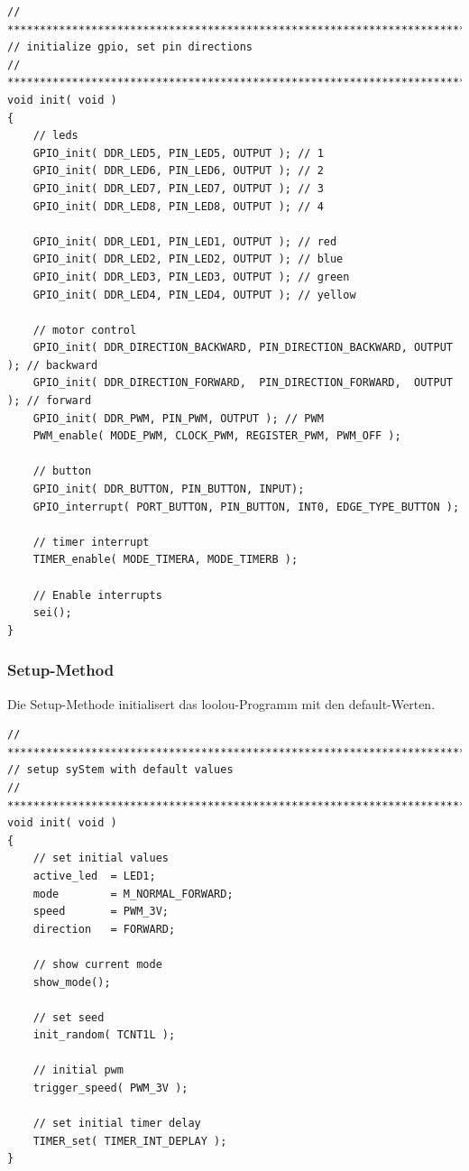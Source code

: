 \vspace{0.5cm}
\begin{lstlisting}[caption={Setup-Method},label=lst:setup]
// ****************************************************************************
// initialize gpio, set pin directions
// ***************************************************************************/
void init( void )
{
	// leds
	GPIO_init( DDR_LED5, PIN_LED5, OUTPUT ); // 1
	GPIO_init( DDR_LED6, PIN_LED6, OUTPUT ); // 2
	GPIO_init( DDR_LED7, PIN_LED7, OUTPUT ); // 3
	GPIO_init( DDR_LED8, PIN_LED8, OUTPUT ); // 4

	GPIO_init( DDR_LED1, PIN_LED1, OUTPUT ); // red
	GPIO_init( DDR_LED2, PIN_LED2, OUTPUT ); // blue
	GPIO_init( DDR_LED3, PIN_LED3, OUTPUT ); // green
	GPIO_init( DDR_LED4, PIN_LED4, OUTPUT ); // yellow

	// motor control
	GPIO_init( DDR_DIRECTION_BACKWARD, PIN_DIRECTION_BACKWARD, OUTPUT ); // backward
	GPIO_init( DDR_DIRECTION_FORWARD,  PIN_DIRECTION_FORWARD,  OUTPUT ); // forward
	GPIO_init( DDR_PWM, PIN_PWM, OUTPUT ); // PWM
	PWM_enable( MODE_PWM, CLOCK_PWM, REGISTER_PWM, PWM_OFF );

	// button
	GPIO_init( DDR_BUTTON, PIN_BUTTON, INPUT);
	GPIO_interrupt( PORT_BUTTON, PIN_BUTTON, INT0, EDGE_TYPE_BUTTON );

	// timer interrupt
	TIMER_enable( MODE_TIMERA, MODE_TIMERB );

	// Enable interrupts
	sei();
}
\end{lstlisting}
\vspace{0.5cm}

\subsubsection{Setup-Method}

Die Setup-Methode initialisert das loolou-Programm mit den default-Werten.

\vspace{0.5cm}
\begin{lstlisting}[caption={Init-Method},label=lst:init]
// ****************************************************************************
// setup syStem with default values
// ***************************************************************************/
void init( void )
{
	// set initial values
	active_led  = LED1;
	mode        = M_NORMAL_FORWARD;
	speed       = PWM_3V;
	direction   = FORWARD;

	// show current mode
	show_mode();

	// set seed
	init_random( TCNT1L );

	// initial pwm
	trigger_speed( PWM_3V );

	// set initial timer delay
	TIMER_set( TIMER_INT_DEPLAY );
}
\end{lstlisting}
\vspace{0.5cm}

